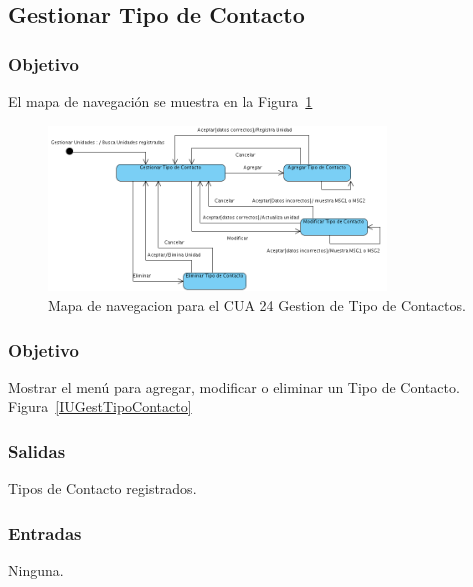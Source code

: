 \subsection{Gestionar Tipo de Contacto}
\subsubsection{Objetivo}
	El mapa de navegación se muestra en la Figura~\ref{fig:mapaNavegacionCUA24}

  \begin{figure}[hbpt!]
 		\centering
 			\includegraphics[width=0.8\textwidth]{images/CUA24/MapaNavegacion.png}
 		\caption{Mapa de navegacion para el CUA 24 Gestion de Tipo de Contactos.}
		\label{fig:mapaNavegacionCUA24}
 	\end{figure}

\subsubsection{Objetivo}
Mostrar el menú para agregar, modificar o eliminar un Tipo de Contacto.
Figura~\ref{IUGestTipoContacto}

\subsubsection{Salidas}
Tipos de Contacto registrados.


\subsubsection{Entradas}
Ninguna.


